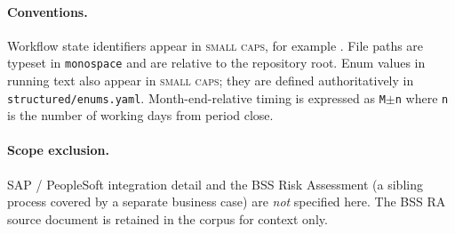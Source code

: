 \paragraph{Conventions.} Workflow state identifiers appear in
\textsc{small caps}, for example .
File paths are typeset in \texttt{monospace} and are relative to the
repository root. Enum values in running text also appear in
\textsc{small caps}; they are defined authoritatively in
\corpus\texttt{structured/enums.yaml}. Month-end-relative timing is
expressed as \texttt{M$\pm$n} where \texttt{n} is the number of working
days from period close.

\paragraph{Scope exclusion.} SAP / PeopleSoft integration detail and the
BSS Risk Assessment (a sibling process covered by a separate business
case) are \emph{not} specified here. The BSS RA source document is
retained in the corpus for context only.
